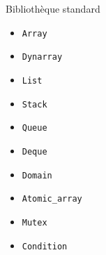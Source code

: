 \begin{frame}{Bibliothèque standard}
\LARGE
\begin{minipage}{0.5\textwidth}
  \begin{itemize}
    \item \texttt{Array}
    \item \texttt{Dynarray}
    \item \texttt{List}
    \item \texttt{Stack}
    \item \texttt{Queue}
    \item \texttt{Deque}
  \end{itemize}
\end{minipage}
\begin{minipage}{0.4\textwidth}
  \begin{itemize}
    \item \texttt{Domain}
    \item \texttt{Atomic\_array}
    \item \texttt{Mutex}
    \item \texttt{Condition}
  \end{itemize}
\end{minipage}
\end{frame}
